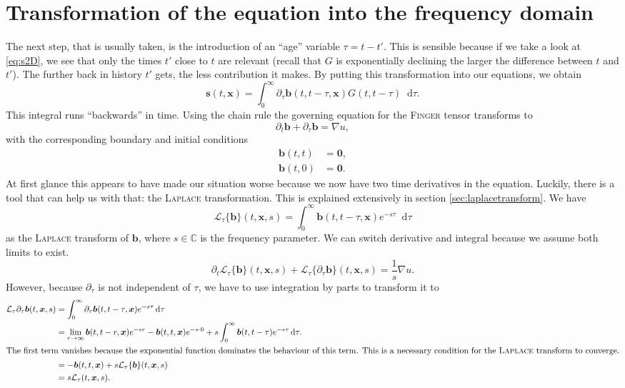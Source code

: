 \documentclass[12pt,a4paper,twoside, open=right]{scrreprt}
\theoremstyle{definition}
\theoremstyle{plain}
\newcommand{\cc}{\mathbb{C}}
\newcommand{\bfb}{\bm{b}}
\newcommand{\bfs}{\bm{s}}
\newcommand{\bfx}{\bm{x}}
\newcommand{\D}{\mathop{}\!\mathrm{d}}
\begin{document}
\section{Transformation of the equation into the frequency domain}
The next step, that is usually taken, is the introduction of an \enquote{age} variable $\tau=t-t'$. This is sensible because if we take a look at \eqref{eq:s2D}, we see that only the times $t'$ close to $t$ are relevant (recall that $G$ is exponentially declining the larger the difference between $t$ and $t'$). The further back in history $t'$ gets, the less contribution it makes. By putting this transformation into our equations, we obtain
\begin{equation}
    \bfs(t,\bfx)=\int_0^\infty\partial_\tau\bfb(t,t-\tau,\bfx)G(t,t-\tau)\D\tau.\label{eq:sage}
\end{equation}
This integral runs \enquote{backwards} in time. Using the chain rule the governing equation for the \textsc{Finger} tensor transforms to  
\begin{equation}
    \partial_t \bfb +\partial_\tau\bfb = \nabla u,
\end{equation}
with the corresponding boundary and initial conditions
\begin{align}
    \bfb(t,t) &= \bm{0},\\
    \bfb(t,0) &= \bm{0}.
\end{align}
At first glance this appears to have made our situation worse because we now have two time derivatives in the equation. Luckily, there is a tool that can help us with that: the \textsc{Laplace} transformation. This is explained extensively in section \ref{sec:laplacetransform}. We have
\begin{equation}
\mathcal{L}_\tau\{\bfb\}(t,\bfx,s) =\int_0^\infty\bfb(t,t-\tau,\bfx)e^{-s\tau}\D\tau
\end{equation}
as the \textsc{Laplace} transform of $\bfb$, where $s\in\cc$ is the frequency parameter. 
We can switch derivative and integral because we assume both limits to exist.
\begin{equation}
    \partial_t\mathcal{L}_\tau\{\bfb\}(t,\bfx,s) + \mathcal{L}_\tau\{\partial_\tau\bfb\}(t,\bfx,s) = \frac{1}{s}\nabla u.
\end{equation}
However, because $\partial_\tau$ is not independent of $\tau$, we have to use integration by parts to transform it to
\begin{align}
    \mathcal{L}_\tau{\partial_\tau\bfb}(t,\bfx,s) &= \int_0^\infty\partial_\tau\bfb(t,t-\tau,\bfx)e^{-s\tau}\D\tau\\ &=\lim_{r\to\infty}\bfb(t,t-r,\bfx)e^{-sr}-\bfb(t,t,\bfx)e^{-s\cdot 0}+s\int_0^\infty\bfb(t,t-\tau)e^{-s\tau}\D\tau.\\
    \intertext{The first term vanishes because the exponential function dominates the behaviour of this term. This is a necessary condition for the \textsc{Laplace} transform to converge.}
    &= -\bfb(t,t,\bfx) +s\mathcal{L}_\tau\{\bfb\}(t,\bfx, s)\\
    &= s\mathcal{L}_\tau(t,\bfx,s).
\end{align}
\end{document}
